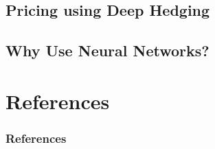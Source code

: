 \documentclass[serif]{beamer}
\begin{document}

\subsection{Pricing using Deep Hedging}
\subsection{Why Use Neural Networks?}

\section{References}
\begin{frame}
    \frametitle{References}
    
    
\end{frame}
\end{document}
